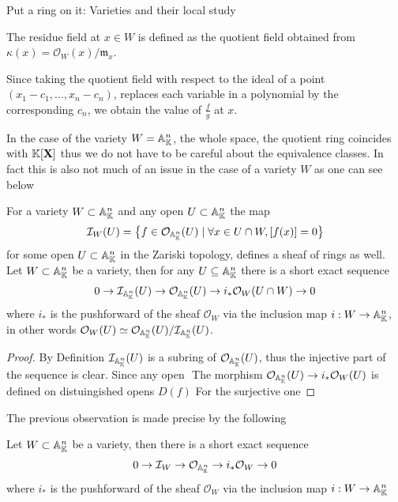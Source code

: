 \begin{subsection}{Put a ring on it: Varieties and their local study}
    \begin{definition}
        The residue field at \( x \in W \) is defined as the quotient field obtained from \( \kappa(x) = \mathcal{O}_W(x) / \mathfrak{m}_x  \).
    \end{definition}
    Since taking the quotient field with respect to the ideal of a point \( (x_1 - c_1, \dots, x_n - c_n) \), replaces each variable in a polynomial
    by the corresponding \( c_n \), we obtain the value of \( \frac{f}{g} \) at \( x \).

    \iffalse

    In the case of the variety \( W = \mathbb{A}^{n}_{\mathbb{K}} \), the whole space, the quotient ring coincides with \( \mathbb{K}[\mathbf{X}] \) thus we do not have to be careful about the  
    equivalence classes. In fact this is also not much of an issue in the case of a variety \( W \) as one can see below 
    \begin{corollary}
        For a variety \( W \subset \mathbb{A}^{n}_{\mathbb{K}} \) and any open \( U \subset \mathbb{A}^{n}_{\mathbb{K}} \) the map 
        \[ \mathcal{I}_W(U) = \left\{f \in \mathcal{O}_{\mathbb{A}^{n}_{\mathbb{K}}}(U) \mid \forall x \in U \cap W, [f(x)] = 0 \right\} \] 
        for some open \( U \subset \mathbb{A}^{n}_{\mathbb{K}} \) in the Zariski topology, defines a sheaf of rings as well.
        Let \( W \subset \mathbb{A}^{n}_{\mathbb{K}} \) be a variety, then for any \( U \subseteq \mathbb{A}^{n}_{\mathbb{K}} \) there is a short exact sequence 
        \begin{align}
            0 \to \mathcal{I}_{\mathbb{A}^{n}_{\mathbb{K}}}(U) \to \mathcal{O}_{\mathbb{A}^{n}_{\mathbb{K}}}(U) \to i_\ast \mathcal{O}_W(U \cap W) \to 0
        \end{align}
        where \( i_\ast \) is the pushforward of the sheaf \( \mathcal{O}_W \) via the inclusion map \( i : W \to \mathbb{A}^{n}_{\mathbb{K}} \), 
        in other words \( \mathcal{O}_W(U) \simeq \mathcal{O}_{\mathbb{A}^{n}_{\mathbb{K}}}(U) / \mathcal{I}_{\mathbb{A}^{n}_{\mathbb{K}}}(U) \).
    \end{corollary}
    \begin{proof}
        By Definition \( \mathcal{I}_{\mathbb{A}^{n}_{\mathbb{K}}}(U) \) is a subring of \( \mathcal{O}_{\mathbb{A}^{n}_{\mathbb{K}}}(U) \), thus the injective part of the sequence is clear.
        Since any open \(  \)
        The morphism \( \mathcal{O}_{\mathbb{A}^{n}_{\mathbb{K}}}(U) \to i_\ast \mathcal{O}_W(U) \) is defined on distuingished opens \( D(f) \) 
        For the surjective one 
    \end{proof}

    The previous observation is made precise by the following

    \begin{corollary}
        Let \( W \subset \mathbb{A}^{n}_{\mathbb{K}} \) be a variety, then there is a short exact sequence 
        \begin{align}
            0 \to \mathcal{I}_W \to \mathcal{O}_{\mathbb{A}^{n}_{\mathbb{K}}} \to i_\ast \mathcal{O}_W \to 0
        \end{align}
        where \( i_\ast \) is the pushforward of the sheaf \( \mathcal{O}_W \) via the inclusion map \( i : W \to \mathbb{A}^{n}_{\mathbb{K}} \)
    \end{corollary}


\end{subsection}
